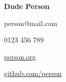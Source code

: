 
\begin{center}
    {\Huge \bfseries Dude Person}\\
\end{center}
\par
\hspace{7.5cm}\icemail \large{person@mail.com}\par
\hspace{7.5cm}\icphone \large{0123 456 789}\par
\hspace{7.5cm}\icwebsite \large{\href{https://person.org}{person.org}}\par
\hspace{7.5cm}\icgithub \large{\href{https://github.com/person}{github.com/person}}
